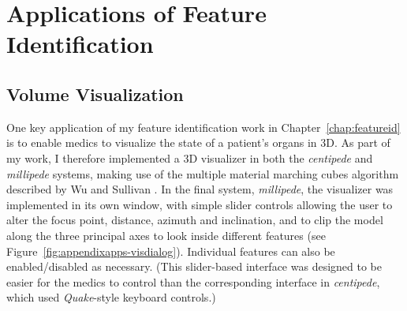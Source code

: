 \chapter{Applications of Feature Identification}
\label{chap:appendixapps}

\section{Volume Visualization}

One key application of my feature identification work in Chapter~\ref{chap:featureid} is to enable medics to visualize the state of a patient's organs in 3D. As part of my work, I therefore implemented a 3D visualizer in both the \emph{centipede} and \emph{millipede} systems, making use of the multiple material marching cubes algorithm described by Wu and Sullivan \cite{wu03}. In the final system, \emph{millipede}, the visualizer was implemented in its own window, with simple slider controls allowing the user to alter the focus point, distance, azimuth and inclination, and to clip the model along the three principal axes to look inside different features (see Figure~\ref{fig:appendixapps-visdialog}). Individual features can also be enabled/disabled as necessary. (This slider-based interface was designed to be easier for the medics to control than the corresponding interface in \emph{centipede}, which used \emph{Quake}-style keyboard controls.)


